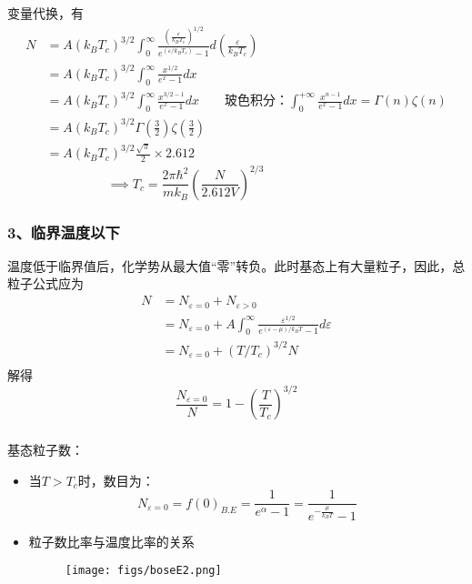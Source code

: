 \begin{frame}
  \frametitle{}
变量代换，有
\[\begin{aligned}
  N &=  A (k_B T_c)^{3/2} \int_0^\infty \frac{(\frac{\varepsilon}{k_B T_c}) ^{1/2}}{e^{(\varepsilon /k_B T_c )}-1} d (\frac{\varepsilon}{k_B T_c}) \\
  &=  A (k_B T_c)^{3/2} \int_0^\infty \frac{x ^{1/2}}{e^x-1} d x \\
  &= A (k_B T_c)^{3/2} \int_0^\infty \frac{x ^{3/2 -1}}{e^x-1} d x \qquad \text{玻色积分：}\int_{0}^{+\infty} \frac{x ^{n -1}}{e^x-1} d x  = \Gamma(n)\zeta(n) \\
  &= A(k_B T_c)^{3/2} \Gamma(\frac{3}{2})\zeta(\frac{3}{2})  \\
  &= A(k_B T_c)^{3/2}\frac{\sqrt{\pi} }{2} \times 2.612 
\end{aligned}\]
\[ \implies T_c = \frac{2\pi \hbar^2}{m k_B} \left( \frac{N}{2.612 V} \right)^{2/3} \qquad \qquad \qquad \qquad\]
\end{frame} 

\begin{frame}
  \frametitle{ 3、临界温度以下 }
  温度低于临界值后，化学势从最大值“零”转负。此时基态上有大量粒子，因此，总粒子公式应为
  \[ \begin{aligned}
    N &= N_{\varepsilon =0} + N_{\varepsilon > 0} \\ 
    &=N_{\varepsilon =0} + A \int_0^\infty \frac{\varepsilon^{1/2}}{e^{(\varepsilon - \mu) /k_B T }-1} d \varepsilon \\
    &=  N_{\varepsilon =0} + \left(T/T_c\right)^{3/2} N \\
  \end{aligned}\]
解得 
\[  \frac{N_{\varepsilon =0}}{N} =  1- \left(\frac{T}{T_c}\right)^{3/2} \]
\end{frame} 

\begin{frame}
  \frametitle{}
\alert{基态粒子数：} 
\begin{itemize}
  \item 当$T>T_c$时，数目为：$$N_{\varepsilon =0} = f(0)_{B.E} = \frac{1}{e^{\alpha}-1} = \frac{1}{e^{-\frac{\mu}{k_B T}}-1}$$ 
  \item 粒子数比率与温度比率的关系
  \begin{figure}[htbp]
    \centering
    \texttt{[image: figs/boseE2.png]}
  \end{figure}
\end{itemize}
\end{frame} 

